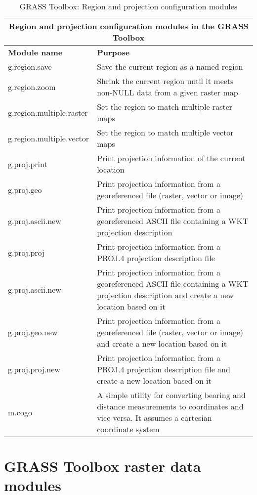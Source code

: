 \begin{table}[H]
\centering
 \begin{tabular}{|p{4cm}|p{10cm}|}
  \hline \multicolumn{2}{|c|}{\textbf{Region and projection configuration
  modules in the GRASS Toolbox}} \\
  \hline \textbf{Module name} & \textbf{Purpose} \\
  \hline g.region.save & Save the current region as a named region \\
  \hline g.region.zoom & Shrink the current region until it meets non-NULL
   data from a given raster map \\
  \hline g.region.multiple.raster & Set the region to match multiple raster
  maps \\
  \hline g.region.multiple.vector & Set the region to match multiple vector
  maps \\
  \hline g.proj.print & Print projection information of the current location\\
  \hline g.proj.geo & Print projection information from a georeferenced file
  (raster, vector or image)\\
  \hline g.proj.ascii.new & Print projection information from a
  georeferenced ASCII file containing a WKT projection description\\
  \hline g.proj.proj & Print projection information from a PROJ.4 projection
  description file\\
  \hline g.proj.ascii.new & Print projection information from a georeferenced
  ASCII file containing a WKT projection description and create a new
  location based on it\\
  \hline g.proj.geo.new & Print projection information from a georeferenced
  file (raster, vector or image) and create a new location based on it\\
  \hline g.proj.proj.new & Print projection information from a PROJ.4
  projection description file and create a new location based on it \\
  \hline m.cogo & A simple utility for converting bearing and distance
  measurements to coordinates and vice versa. It assumes a cartesian
  coordinate system \\
\hline
\end{tabular}
\caption{GRASS Toolbox: Region and projection configuration modules}
\end{table}


\section{GRASS Toolbox raster data modules}

